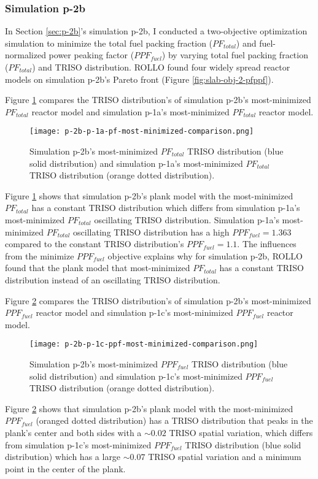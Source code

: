 \subsubsection{Simulation p-2b}
In Section \ref{sec:p-2b}'s simulation p-2b, I conducted a two-objective 
optimization simulation to minimize the total fuel packing fraction ($PF_{total}$) and 
fuel-normalized power peaking factor ($PPF_{fuel}$) by varying total fuel 
packing fraction ($PF_{total}$) and TRISO distribution. 
\gls{ROLLO} found four widely spread reactor models on simulation p-2b's Pareto 
front (Figure \ref{fig:slab-obj-2-pfppf}). 

Figure \ref{fig:p-2b-pf-triso-comparison} compares the TRISO distribution's of 
simulation p-2b's most-minimized $PF_{total}$ reactor model and simulation p-1a's 
most-minimized $PF_{total}$ reactor model. 
\begin{figure}[htbp!]
    \centering
    \texttt{[image: p-2b-p-1a-pf-most-minimized-comparison.png]} 
    \caption{Simulation p-2b's most-minimized $PF_{total}$ TRISO distribution (blue 
    solid distribution) and simulation p-1a's most-minimized $PF_{total}$ TRISO 
    distribution (orange dotted distribution).}
    \label{fig:p-2b-pf-triso-comparison}
\end{figure}
Figure \ref{fig:p-2b-pf-triso-comparison} shows that simulation p-2b's plank model 
with the most-minimized $PF_{total}$ has a constant TRISO distribution which differs 
from simulation p-1a's most-minimized $PF_{total}$ oscillating TRISO distribution. 
Simulation p-1a's most-minimized $PF_{total}$ oscillating TRISO distribution has a 
high $PPF_{fuel} = 1.363$ compared to the constant TRISO distribution's 
$PPF_{fuel} = 1.1$.
The influences from the minimize $PPF_{fuel}$ objective explains why for simulation p-2b, 
\gls{ROLLO} found that the plank model that most-minimized $PF_{total}$ has a 
constant TRISO distribution instead of an oscillating TRISO distribution.

Figure \ref{fig:p-2b-ppf-triso-comparison} compares the TRISO distribution's of 
simulation p-2b's most-minimized $PPF_{fuel}$ reactor model and simulation p-1c's 
most-minimized $PPF_{fuel}$ reactor model. 
\begin{figure}[htbp!]
    \centering
    \texttt{[image: p-2b-p-1c-ppf-most-minimized-comparison.png]} 
    \caption{Simulation p-2b's most-minimized $PPF_{fuel}$ TRISO distribution (blue 
    solid distribution) and simulation p-1c's most-minimized $PPF_{fuel}$ TRISO 
    distribution (orange dotted distribution).}
    \label{fig:p-2b-ppf-triso-comparison}
\end{figure}
Figure \ref{fig:p-2b-ppf-triso-comparison} shows that simulation p-2b's plank model 
with the most-minimized $PPF_{fuel}$ (oranged dotted distribution) has a TRISO 
distribution that peaks in the plank's center and both sides with a ${\sim}0.02$ 
TRISO spatial variation, which differs from simulation p-1c's most-minimized 
$PPF_{fuel}$ TRISO distribution (blue solid distribution) which has a 
large ${\sim} 0.07$ TRISO spatial variation and a minimum point in the center of the 
plank.

